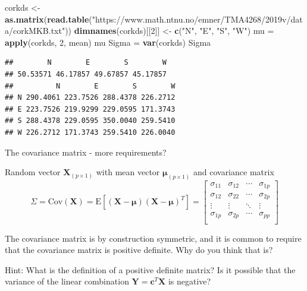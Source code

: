 \documentclass[ignorenonframetext,]{beamer}
\newenvironment{Shaded}{\begin{snugshade}}{\end{snugshade}}
\newcommand{\KeywordTok}[1]{\textcolor[rgb]{0.13,0.29,0.53}{\textbf{#1}}}
\newcommand{\DecValTok}[1]{\textcolor[rgb]{0.00,0.00,0.81}{#1}}
\newcommand{\StringTok}[1]{\textcolor[rgb]{0.31,0.60,0.02}{#1}}
\newcommand{\NormalTok}[1]{#1}
\begin{document}
\begin{frame}[fragile]

\begin{Shaded}
\begin{Highlighting}[]
\NormalTok{corkds <-}\StringTok{ }\KeywordTok{as.matrix}\NormalTok{(}\KeywordTok{read.table}\NormalTok{(}\StringTok{"https://www.math.ntnu.no/emner/TMA4268/2019v/data/corkMKB.txt"}\NormalTok{))}
\KeywordTok{dimnames}\NormalTok{(corkds)[[}\DecValTok{2}\NormalTok{]] <-}\StringTok{ }\KeywordTok{c}\NormalTok{(}\StringTok{"N"}\NormalTok{, }\StringTok{"E"}\NormalTok{, }\StringTok{"S"}\NormalTok{, }\StringTok{"W"}\NormalTok{)}
\NormalTok{mu =}\StringTok{ }\KeywordTok{apply}\NormalTok{(corkds, }\DecValTok{2}\NormalTok{, mean)}
\NormalTok{mu}
\NormalTok{Sigma =}\StringTok{ }\KeywordTok{var}\NormalTok{(corkds)}
\NormalTok{Sigma}
\end{Highlighting}
\end{Shaded}

\begin{verbatim}
##        N        E        S        W 
## 50.53571 46.17857 49.67857 45.17857 
##          N        E        S        W
## N 290.4061 223.7526 288.4378 226.2712
## E 223.7526 219.9299 229.0595 171.3743
## S 288.4378 229.0595 350.0040 259.5410
## W 226.2712 171.3743 259.5410 226.0040
\end{verbatim}

\end{frame}

\begin{frame}

\begin{block}{The covariance matrix - more requirements?}

Random vector \(\mathbf{X}_{(p\times 1)}\) with mean vector
\(\mathbf{\mu}_{(p\times 1)}\) and covariance matrix
\[\Sigma=\text{Cov}(\mathbf{X})=\text{E}[(\mathbf{X}-\mathbf{\mu})(\mathbf{X}-\mathbf{\mu})^T]=
\left[ \begin{array}{cccc}
    \sigma_{11} & \sigma_{12} & \cdots & \sigma_{1p}\\
    \sigma_{12} & \sigma_{22} & \cdots & \sigma_{2p}\\
    \vdots & \vdots & \ddots & \vdots\\
    \sigma_{1p} & \sigma_{2p} & \cdots & \sigma_{pp}\\
\end{array} \right]\]

The covariance matrix is by construction symmetric, and it is common to
require that the covariance matrix is positive definite. Why do you
think that is?

Hint: What is the definition of a positive definite matrix? Is it
possible that the variance of the linear combination
\(\mathbf{Y}=\mathbf{c}^T\mathbf{X}\) is negative?

\end{block}

\end{frame}
\end{document}

